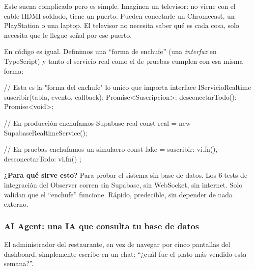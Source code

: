 \documentclass[12pt,a4paper]{article}
\begin{document}
Este suena complicado pero es simple. Imaginen un televisor: no viene con el cable HDMI soldado, tiene un puerto. Pueden conectarle un Chromecast, un PlayStation o una laptop. El televisor no necesita saber qué es cada cosa, solo necesita que le llegue señal por ese puerto.

En código es igual. Definimos una ``forma de enchufe'' (una \textit{interfaz} en TypeScript) y tanto el servicio real como el de pruebas cumplen con esa misma forma:

\begin{codeblock}
// Esta es la "forma del enchufe" lo unico que importa
interface IServicioRealtime {
  suscribir(tabla, evento, callback): Promise<Suscripcion>;
  desconectarTodo(): Promise<void>;
}

// En producción enchufamos Supabase real
const real = new SupabaseRealtimeService();

// En pruebas enchufamos un simulacro
const fake = { suscribir: vi.fn(), desconectarTodo: vi.fn() };
\end{codeblock}

\begin{tipbox}
\textbf{¿Para qué sirve esto?} Para probar el sistema sin base de datos. Los 6 tests de integración del Observer corren sin Supabase, sin WebSocket, sin internet. Solo validan que el ``enchufe'' funcione. Rápido, predecible, sin depender de nada externo.
\end{tipbox}

\subsubsection{AI Agent: una IA que consulta tu base de datos}

El administrador del restaurante, en vez de navegar por cinco pantallas del dashboard, simplemente escribe en un chat: ``¿cuál fue el plato más vendido esta semana?''.
\end{document}
